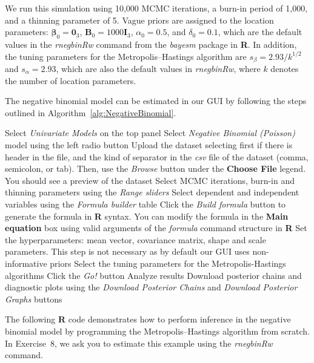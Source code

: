 We run this simulation using 10,000 MCMC iterations, a burn-in period of 1,000, and a thinning parameter of 5. Vague priors are assigned to the location parameters: $\bm{\beta}_0 = \bm{0}_{3}$, $\bm{B}_0 = 1000\bm{I}_{3}$, $\alpha_0 = 0.5$, and $\delta_0 = 0.1$, which are the default values in the \textit{rnegbinRw} command from the \textit{bayesm} package in \textbf{R}. In addition, the tuning parameters for the Metropolis–Hastings algorithm are $s_{\beta} = 2.93 / k^{1/2}$ and $s_{\alpha} = 2.93$, which are also the default values in \textit{rnegbinRw}, where $k$ denotes the number of location parameters.

The negative binomial model can be estimated in our GUI by following the steps outlined in Algorithm~\ref{alg:NegativeBinomial}.

\begin{algorithm}[h!]
	\caption{Negative binomial models}\label{alg:NegativeBinomial}
	\begin{algorithmic}[1]  		 			
		\State Select \textit{Univariate Models} on the top panel
		\State Select \textit{Negative Binomial (Poisson)} model using the left radio button
		\State Upload the dataset selecting first if there is header in the file, and the kind of separator in the \textit{csv} file of the dataset (comma, semicolon, or tab). Then, use the \textit{Browse} button under the \textbf{Choose File} legend. You should see a preview of the dataset
		\State Select MCMC iterations, burn-in and thinning parameters using the \textit{Range sliders}
		\State Select dependent and independent variables using the \textit{Formula builder} table
		\State Click the \textit{Build formula} button to generate the formula in \textbf{R} syntax. You can modify the formula in the \textbf{Main equation} box using valid arguments of the \textit{formula} command structure in \textbf{R}
		\State Set the hyperparameters: mean vector, covariance matrix, shape and scale parameters. This step is not necessary as by default our GUI uses non-informative priors
		\State Select the tuning parameters for the Metropolis-Hastings algorithms 
		\State Click the \textit{Go!} button
		\State Analyze results
		\State Download posterior chains and diagnostic plots using the \textit{Download Posterior Chains} and \textit{Download Posterior Graphs} buttons
	\end{algorithmic} 
\end{algorithm}

The following \textbf{R} code demonstrates how to perform inference in the negative binomial model by programming the Metropolis–Hastings algorithm from scratch. In Exercise~8, we ask you to estimate this example using the \textit{rnegbinRw} command.


